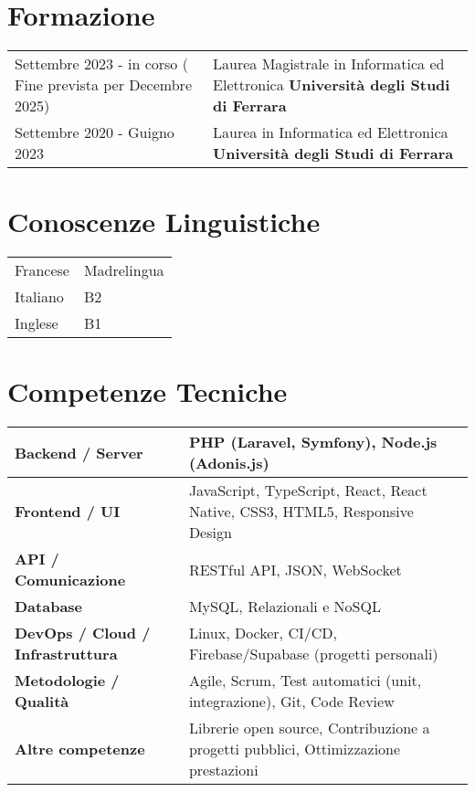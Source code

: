 \documentclass[a4paper,12pt]{article}
\begin{document}
\section{Formazione}
\begin{tabularx}{\linewidth}{@{}l X@{}}
Settembre 2023 - in corso ( Fine prevista per Decembre 2025) & Laurea Magistrale in Informatica ed Elettronica  \textbf{Università degli Studi di Ferrara} \\
Settembre 2020 - Guigno 2023 & Laurea in Informatica ed Elettronica  \textbf{Università degli Studi di Ferrara} \\
\end{tabularx}

\section{Conoscenze Linguistiche}
\begin{tabularx}{\linewidth}{@{}l X@{}}
Francese & Madrelingua \\
Italiano & B2 \\
Inglese & B1 \\
\end{tabularx}


\section{Competenze Tecniche}

\begin{tabularx}{\linewidth}{|>{\raggedright\arraybackslash}p{4cm}|X|}
\hline
\textbf{Backend / Server} & PHP (Laravel, Symfony), Node.js (Adonis.js) \\
\hline
\textbf{Frontend / UI} & JavaScript, TypeScript, React, React Native, CSS3, HTML5, Responsive Design \\
\hline
\textbf{API / Comunicazione} & RESTful API, JSON, WebSocket \\
\hline
\textbf{Database} & MySQL, Relazionali e NoSQL \\
\hline
\textbf{DevOps / Cloud / Infrastruttura} & Linux, Docker, CI/CD, Firebase/Supabase (progetti personali)  \\
\hline
\textbf{Metodologie / Qualità} & Agile, Scrum, Test automatici (unit, integrazione), Git, Code Review \\
\hline
\textbf{Altre competenze} & Librerie open source, Contribuzione a progetti pubblici, Ottimizzazione prestazioni \\
\hline
\end{tabularx}
\end{document}

